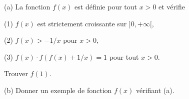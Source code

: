 (a) La fonction $f(x)$ est définie pour tout $x > 0$ et vérifie

(1) $f(x)$ est strictement croissante sur $]0, +\infty[$,

(2) $f(x) > -1/x$ pour $x > 0$,

(3) $f(x) \cdot f(f(x) + 1/x) = 1$ pour tout $x > 0$.

Trouver $f(1)$.

(b) Donner un exemple de fonction $f(x)$ vérifiant (a).
